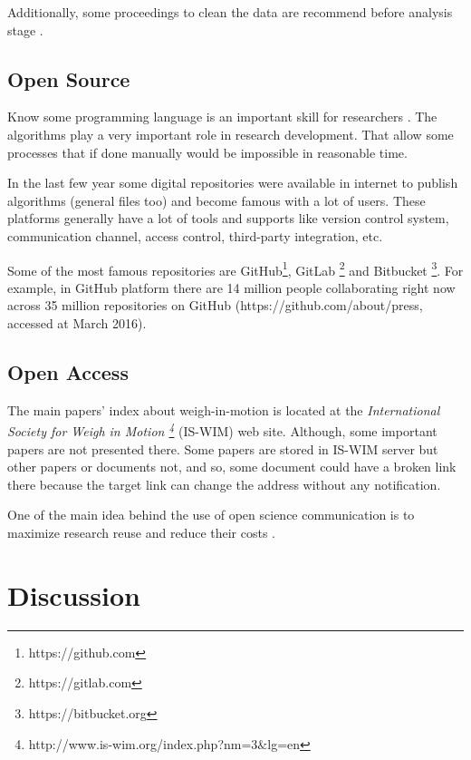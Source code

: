 \documentclass[a4paper]{article}
\begin{document}
{Additionally, some proceedings to clean the data are recommend before analysis stage \cite{elkins2008development, enright2011cleaning}.

\subsection{Open Source}\label{open-source}

Know some programming language is an important skill for researchers \cite{ayer2014scientists}. The algorithms play a very important role in research development. That allow some processes that if done manually would be impossible in reasonable time.

In the last few year some digital repositories were available in internet to publish algorithms (general files too) and become famous with a lot of users. These platforms generally have a lot of tools and supports like version control system, communication channel, access control, third-party integration, etc.

Some of the most famous repositories are GitHub\footnote{https://github.com}, GitLab \footnote{https://gitlab.com} and Bitbucket \footnote{https://bitbucket.org}. For example, in GitHub platform there are 14 million people collaborating right now across 35 million repositories on GitHub (https://github.com/about/press, accessed at March 2016).
 
\subsection{Open Access}\label{open-access}

The main papers' index	about weigh-in-motion is located at the \textit{International Society for Weigh in Motion \footnote{http://www.is-wim.org/index.php?nm=3$\&$lg=en}} (IS-WIM) web site. Although, some important papers are not presented there. Some papers are stored in IS-WIM server but other papers or documents not, and so, some document could have a broken link there because the target link can change the address without any notification. 

One of the main idea behind the use of open science communication is to maximize research reuse and reduce their costs \cite{assante2015science}.



\section{Discussion}\label{discussion}

}
\end{document}
